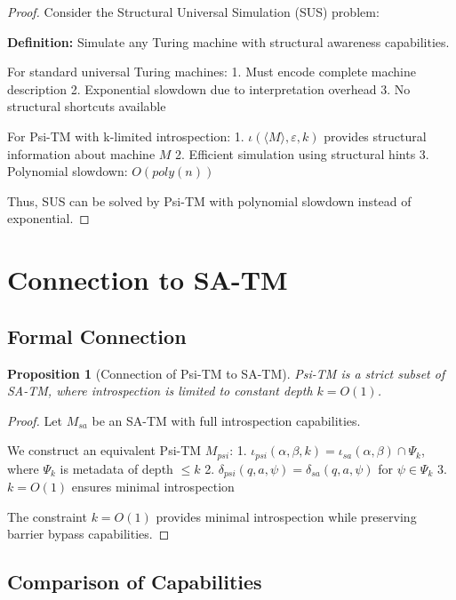 \documentclass[11pt]{article}
\newtheorem{proposition}{Proposition}
\begin{document}
\begin{proof}
Consider the Structural Universal Simulation (SUS) problem:

\textbf{Definition:} Simulate any Turing machine with structural awareness capabilities.

For standard universal Turing machines:
1. Must encode complete machine description
2. Exponential slowdown due to interpretation overhead
3. No structural shortcuts available

For Psi-TM with k-limited introspection:
1. $\iota(\langle M \rangle, \varepsilon, k)$ provides structural information about machine $M$
2. Efficient simulation using structural hints
3. Polynomial slowdown: $O(poly(n))$

Thus, SUS can be solved by Psi-TM with polynomial slowdown instead of exponential.
\end{proof}

\section{Connection to SA-TM}

\subsection{Formal Connection}

\begin{proposition}[Connection of Psi-TM to SA-TM]
Psi-TM is a strict subset of SA-TM, where introspection is limited to constant depth $k = O(1)$.
\end{proposition}

\begin{proof}
Let $M_{sa}$ be an SA-TM with full introspection capabilities.

We construct an equivalent Psi-TM $M_{psi}$:
1. $\iota_{psi}(\alpha, \beta, k) = \iota_{sa}(\alpha, \beta) \cap \Psi_k$, where $\Psi_k$ is metadata of depth $\leq k$
2. $\delta_{psi}(q, a, \psi) = \delta_{sa}(q, a, \psi)$ for $\psi \in \Psi_k$
3. $k = O(1)$ ensures minimal introspection

The constraint $k = O(1)$ provides minimal introspection while preserving barrier bypass capabilities.
\end{proof}

\subsection{Comparison of Capabilities}
\end{document}
